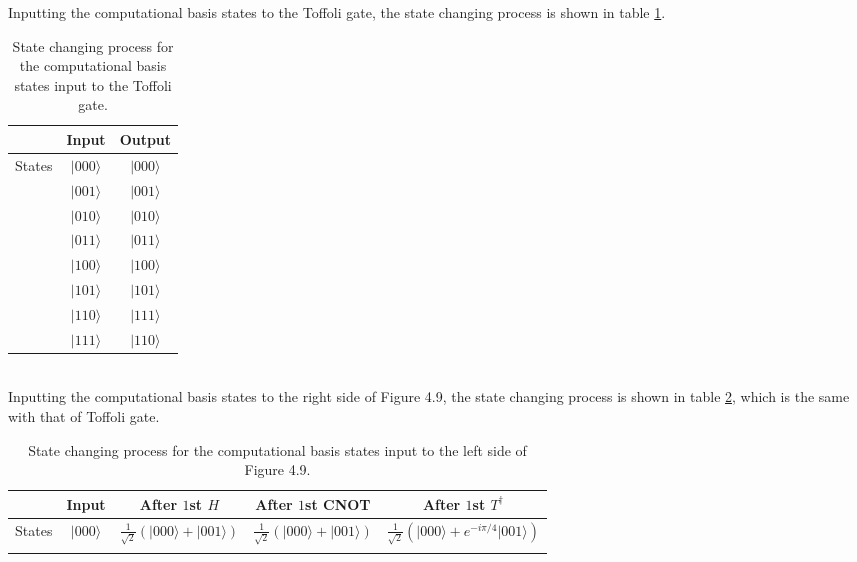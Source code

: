 \documentclass[en]{sol-man}
\begin{document}
\begin{pf}
    Inputting the computational basis states to the Toffoli gate, the state changing process is shown in table \ref{E4.24-state-changing-process-1}.
    \begin{table}[h]
        \centering
        \caption{State changing process for the computational basis states input to the Toffoli gate.}
        \label{E4.24-state-changing-process-1}
        \begin{tabular}{|c|c|c|}
        \hline
        & Input & Output \\ \hline
        \multirow{8}{*}{States} & $\lvert 000\rangle$ & $\lvert 000\rangle$ \\ \cline{2-3} 
        & $\lvert 001\rangle$ & $\lvert 001\rangle$ \\ \cline{2-3} 
        & $\lvert 010\rangle$ & $\lvert 010\rangle$ \\ \cline{2-3} 
        & $\lvert 011\rangle$ & $\lvert 011\rangle$ \\ \cline{2-3} 
        & $\lvert 100\rangle$ & $\lvert 100\rangle$ \\ \cline{2-3} 
        & $\lvert 101\rangle$ & $\lvert 101\rangle$ \\ \cline{2-3} 
        & $\lvert 110\rangle$ & $\lvert 111\rangle$ \\ \cline{2-3} 
        & $\lvert 111\rangle$ & $\lvert 110\rangle$ \\ \hline
        \end{tabular}
    \end{table}\\
    Inputting the computational basis states to the right side of Figure 4.9, the state changing process is shown in table \ref{E4.24-state-changing-process-2}, which is the same with that of Toffoli gate.
    \begin{table}[h]
        \centering\scriptsize
        \caption{State changing process for the computational basis states input to the left side of Figure 4.9.}
        \label{E4.24-state-changing-process-2}
        \begin{tabular}{|c|c|c|c|c|}
            \hline
             & Input & After $1$st $H$ & After $1$st CNOT & After $1$st $T^{\dagger}$ \\ \hline
            \multirow{8}{*}{States} & $\lvert 000\rangle$ & $\frac{1}{\sqrt{2}}(\lvert 000\rangle+\lvert 001\rangle)$ & $\frac{1}{\sqrt{2}}(\lvert 000\rangle+\lvert 001\rangle)$ & $\frac{1}{\sqrt{2}}(\lvert 000\rangle+e^{-i\pi/4}\lvert 001\rangle)$ \\ \cline{2-5} 

\end{tabular}
\end{table}
\end{pf}
\end{document}
